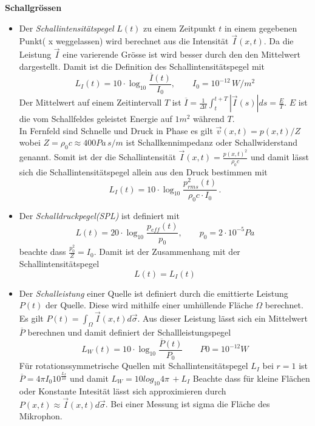 \documentclass[11pt,a4paper,DIV12,BCOR1.5mm]{scrartcl}
\begin{document}
\textbf{Schallgrössen}
\begin{itemize}
	\item Der \emph{Schallintensitätspegel} $L(t)$ zu einem Zeitpunkt $t$ in einem gegebenen Punkt( x weggelassen) wird berechnet aus die Intensität $\vec I(x,t)$. Da  die Leistung $\vec{I}$ eine varierende Grösse ist wird besser durch den den Mittelwert dargestellt. Damit ist die Definition des  Schallintensitätspegel mit 
		\begin{equation}
			L_I(t)=10\cdot \log_{10}\frac{\overline{I} (t)}{I_0}, \qquad I_0 = 10^{-12}\, W/m^2
		\end{equation}
		Der Mittelwert auf einem Zeitintervall $T$ ist  $\overline{I}=\frac{1}{\Delta t}\int_t^{t+T}|\vec{I}(s)| ds =\frac{E}{T}$. $E$ ist die  vom  Schallfeldes geleistet Energie auf $1m^2$ während $T$. \\
		In Fernfeld sind Schnelle und Druck in Phase es gilt $\vec{v}(x,t) = p(x,t)/Z$   wobei $Z=\rho_0 c \approx 400 Pa\,s/m$ ist Schallkennimpedanz oder Schallwiderstand genannt. Somit ist der die Schallintensität $\vec I(x,t) =\frac{p(x,t)^2}{\rho_0 c}$ und damit lässt sich die Schallintensitätspegel allein aus den Druck bestimmen mit
		\begin{equation}
		L_I(t)=10\cdot \log_{10}\frac{p_{rms}^2 (t)}{\rho_0 c \cdot I_0}\,.
		\end{equation}
		
		
	\item Der \emph{Schalldruckpegel(SPL)} ist definiert mit
		\begin{equation}
			L(t)=20\cdot \log_{10}\frac{p_{eff} (t)}{p_0},\qquad p_0 =2 \cdot 10^{-5} Pa
		\end{equation}
		beachte dass $\frac{p_0^2}{Z}= I_0$. Damit ist der Zusammenhang mit der Schallintensitätspegel
		\begin{equation}
		L(t)= L_I(t)
		\end{equation}
		

	\item	Der \emph{Schalleistung} einer Quelle ist definiert  durch die emittierte Leistung $ P(t) $ der Quelle. Diese wird mithilfe einer umhüllende Fläche  $\Omega$ berechnet. Es gilt  $P(t)=\int_\Omega \vec I(x,t)d\vec \sigma$. Aus dieser Leistung lässt sich ein Mittelwert $\overline{P}$ berechnen und damit definiert der Schallleistungspegel  
	\begin{equation}
		L_W(t)=10\cdot \log_{10}\frac{\overline{P}(t)}{P_0} \qquad P0 = 10^{-12} W
	\end{equation}
	Für rotationssymmetrische Quellen mit Schallintensitätspegel $L_I$ bei $r=1$ ist $\overline{P} = 4\pi I_0 10^{\frac{L_I}{10}}$ und damit $L_W = 10 log_{10} 4\pi\,+ L_I$
	Beachte dass für kleine Flächen oder Konstante Intesität lässt sich approximieren durch $P(x,t) \approx \vec I(x,t) d\vec \sigma $. Bei einer Messung ist sigma die Fläche des Mikrophon.


\end{itemize}
\end{document}
